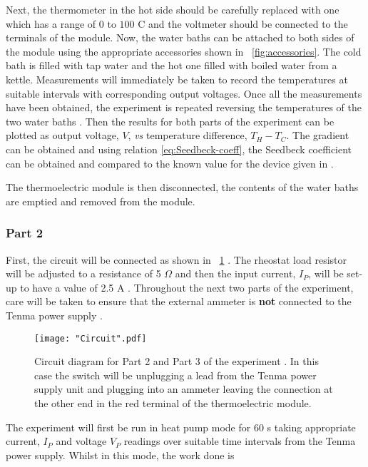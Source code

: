 \documentclass{article}
\newcommand{\figref}[2][\figurename~]{#1\ref{#2}}
\begin{document}
\vspace{2mm}  
\noindent
Next, the thermometer in the hot side should be carefully replaced with one which has a range of $0$ to $100$ C and the voltmeter should be connected to the terminals of the module. Now, the water baths can be attached to both sides of the module using the appropriate accessories shown in \figref{fig:accessories}. The cold bath is filled with tap water and the hot one filled with boiled water from a kettle. Measurements will immediately be taken to record the temperatures at suitable intervals with corresponding output voltages. Once all the measurements have been obtained, the experiment is repeated reversing the temperatures of the two water baths \cite{Paper02}. Then the results for both parts of the experiment can be plotted as output voltage, $V$, \textit{vs} temperature difference, $T_H - T_C$. The gradient can be obtained and using relation \eqref{eq:Seedbeck-coeff}, the Seedbeck coefficient can be obtained and compared to the known value for the device given in \cite{Paper02}.

\vspace{2mm}  
\noindent
The thermoelectric module is then disconnected, the contents of the water baths are emptied and removed from the module. 

\subsubsection{Part 2}
\label{sssec:part2}

First, the circuit will be connected as shown in \figref{fig:circuit} \cite{Paper02}. The rheostat load resistor will be adjusted to a resistance of 5 $\Omega$ and then the input current, $I_P$, will be set-up to have a value of 2.5 A \cite{Paper02}. Throughout the next two parts of the experiment, care will be taken to ensure that the external ammeter is \textbf{not} connected to the Tenma power supply \cite{Paper02}.

\begin{figure}[h]
\centering
\texttt{[image: "Circuit".pdf]}
\caption{Circuit diagram for Part 2 and Part 3 of the experiment \cite{Paper02}. In this case the switch will be unplugging a lead from the Tenma power supply unit and plugging into an ammeter leaving the connection at the other end in the red terminal of the thermoelectric module.}
\label{fig:circuit}
\end{figure}

\vspace{2mm}  
\noindent
The experiment will first be run in heat pump mode for 60 s taking appropriate current, $I_P$ and voltage $V_P$ readings over suitable time intervals from the Tenma power supply. Whilst in this mode, the work done is
\end{document}
